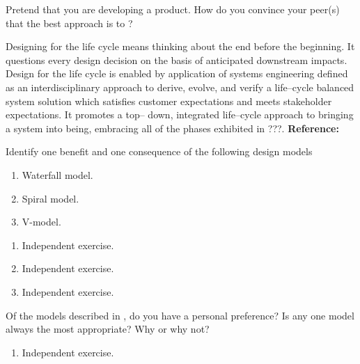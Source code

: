 \begin{exercises}
    \begin{exercise}
    \label{sea-2-12}
        Pretend that you are developing a product. How do you convince your peer(s) that the best approach is to ?
    \end{exercise}
    \begin{solution}
        Designing for the life cycle means thinking about the end before the beginning. It questions every design decision on the basis of anticipated downstream impacts. Design for the life cycle is enabled by application of systems engineering defined as an interdisciplinary approach to derive, evolve, and verify a life–cycle balanced system solution which satisfies customer expectations and meets stakeholder expectations. It promotes a top– down, integrated life–cycle approach to bringing a system into being, embracing all of the phases exhibited in ???. \textbf{Reference:}
    \end{solution}
    
    \begin{exercise}
    \label{sea-2-14} 
        Identify one benefit and one consequence of the following design models
        \begin{enumerate}[label=\alph*)]
            \item Waterfall model.
            \item Spiral model.
            \item V-model.
        \end{enumerate}
    \end{exercise}
    \begin{solution}
        \begin{enumerate}[label=\alph*)]
            \item Independent exercise.
            \item Independent exercise.
            \item Independent exercise.
        \end{enumerate}
    \end{solution}
    
    \begin{exercise}
    \label{sea-2-14_part2}
        Of the models described in , do you have a personal preference? Is any one model always the most appropriate? Why or why not?
    \end{exercise}
    \begin{solution}
        \begin{enumerate}[label=\alph*)]
            \item Independent exercise.
        \end{enumerate}
    \end{solution}
    

\end{exercises}
